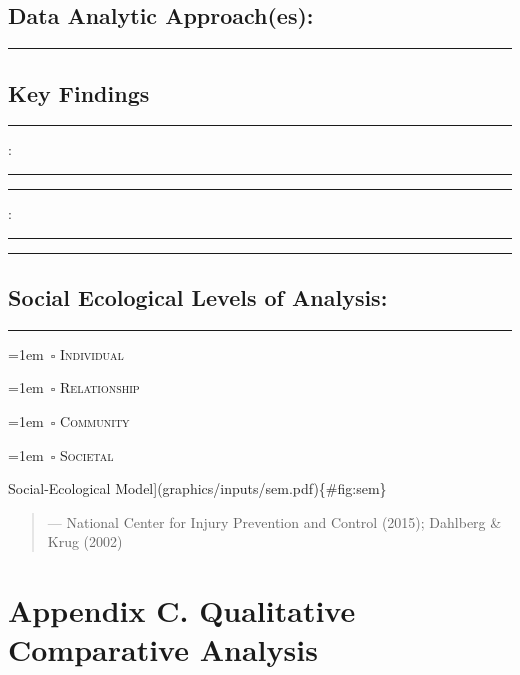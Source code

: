 \documentclass[11pt,]{tufte-book}
\newcommand{\Frule}{
    \vspace*{-1em}
    \begin{fullwidth}\textcolor{blublk}{\rule{\linewidth}{0.2mm}}\end{fullwidth}
}
\newcommand{\SFrule}[1][0.1mm]{
    \begin{fullwidth}\textcolor{blublk}{\rule{\linewidth}{#1}}\end{fullwidth}
}
\begin{document}
\tufteskip

\section{Data Analytic Approach(es):}\label{data-analytic-approaches}

\Frule

\tufteskip

\tufteskip

\section{Key Findings}\label{key-findings}

\Frule

:

\medskip

\SFrule

\medskip

\SFrule

:

\medskip

\SFrule

\medskip

\SFrule

\tufteskip

\section{Social Ecological Levels of
Analysis:}\label{social-ecological-levels-of-analysis}

\Frule

\parindent=1em~\(\square\) \textsc{Individual}

\parindent=1em~\(\square\) \textsc{Relationship}

\parindent=1em~\(\square\) \textsc{Community}

\parindent=1em~\(\square\) \textsc{Societal}

Social-Ecological Model{]}(graphics/inputs/sem.pdf)\{\#fig:sem\}

\begin{quote}
\hfill --- National Center for Injury Prevention and Control (2015);
Dahlberg \& Krug (2002)
\end{quote}

\chapter{Appendix C. Qualitative Comparative
Analysis}\label{appendix-c.-qualitative-comparative-analysis}
\end{document}
